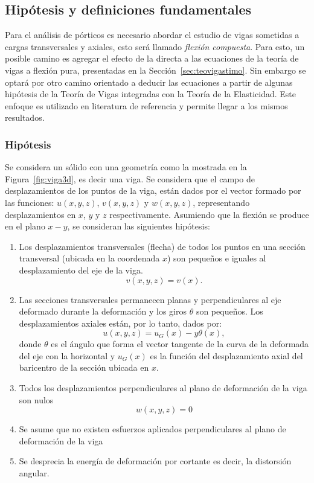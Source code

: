 \subsection{Hipótesis y definiciones fundamentales}

Para el análisis de pórticos es necesario abordar el estudio de vigas sometidas a cargas transversales y axiales, esto será llamado \textit{flexión compuesta}. %
%
Para esto, un posible camino es agregar el efecto de la directa a las ecuaciones de la teoría de vigas a flexión pura, presentadas en la Sección~\ref{sec:teovigastimo}. %
%
Sin embargo se optará por otro camino orientado a deducir las ecuaciones a partir de algunas hipótesis de la Teoría de Vigas integradas con la Teoría de la Elasticidad. %
%
Este enfoque es utilizado en literatura de referencia \citep{Wunderlich2002,Onate2013} y permite llegar a los mismos resultados.

\subsubsection{Hipótesis}
Se considera un sólido con una geometría como la mostrada en la Figura~\ref{fig:viga3d}, es decir una viga. Se considera que el campo de desplazamientos de los puntos de la viga, están dados por el vector formado por las funciones: $u(x,y,z)$, $v(x,y,z)$ y $w(x,y,z)$, representando desplazamientos en $x$, $y$ y $z$ respectivamente. %
%
Asumiendo que la flexión se produce en el plano $x-y$, se consideran las siguientes hipótesis:
%
\begin{enumerate}
	\item Los desplazamientos transversales (flecha) de todos los puntos en una sección transversal (ubicada en la coordenada $x$)  son pequeños e iguales al desplazamiento del eje de la viga.
	$$
	v(x,y,z) =  v(x).
	$$
	\item Las secciones transversales permanecen planas y perpendiculares al eje deformado durante la deformación y los giros $\theta$ son pequeños. %
	Los desplazamientos axiales están, por lo tanto, dados por:
	\begin{equation} \label{eqn:despaxi}
	u(x,y,z) = u_G(x) - y \theta(x),
	\end{equation}
	donde $\theta$ es el ángulo que forma el vector tangente de la curva de la deformada del eje con la horizontal y $u_G(x)$ es la función del desplazamiento axial del baricentro de la sección ubicada en $x$. 
	\item Todos los desplazamientos perpendiculares al plano de deformación de la viga son nulos
$$
w(x,y,z) = 0
$$
	\item Se asume que no existen esfuerzos aplicados perpendiculares al plano de deformación de la viga
	\item Se desprecia la energía de deformación por cortante es decir, la distorsión angular.
\end{enumerate}

